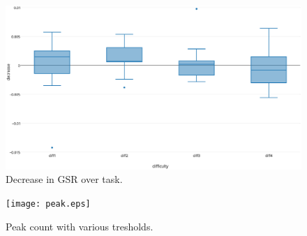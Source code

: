 \documentclass[11pt,leqno,a4paper]{report} %
\begin{document}
\begin{figure}[H]
  \centering
 	\hspace*{-.3\textwidth}   
 	\includegraphics[width=1.6\textwidth]{decgsr.eps}
  \caption{Decrease in GSR over task.}
\end{figure}

\begin{figure}[H]
  \centering
 	\hspace*{-.3\textwidth}   
 	\texttt{[image: peak.eps]}
  \caption{Peak count with various tresholds.}
\end{figure}




{}
%
\end{document}
